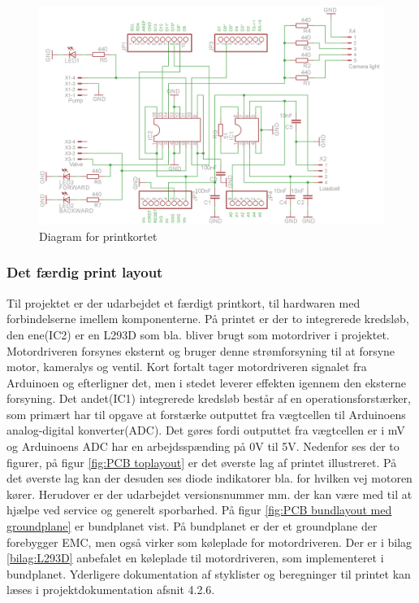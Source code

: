 \begin{figure}[H]
	\centering
	\includegraphics[width=1\textwidth]{billeder/Hovedrapport/Diagram.png}
	\caption{Diagram for printkortet}
	\label{fig:PCBdiagram}
\end{figure}

\newpage

\subsubsection{Det færdig print layout}
Til projektet er der udarbejdet et færdigt printkort, til hardwaren med forbindelserne imellem komponenterne. På printet er der to integrerede kredsløb, den ene(IC2) er en L293D som bla. bliver brugt som motordriver i projektet. Motordriveren forsynes eksternt og bruger denne strømforsyning til at forsyne motor, kameralys og ventil. Kort fortalt tager motordriveren signalet fra Arduinoen og efterligner det, men i stedet leverer effekten igennem den eksterne forsyning. Det andet(IC1) integrerede kredsløb består af en operationsforstærker, som primært har til opgave at forstærke outputtet fra vægtcellen til Arduinoens analog-digital konverter(ADC). Det gøres fordi outputtet fra vægtcellen er i mV og Arduinoens ADC har en arbejdsspænding på 0V til 5V. Nedenfor ses der to figurer, på figur \ref{fig:PCB toplayout} er det øverste lag af printet illustreret. På det øverste lag kan der desuden ses diode indikatorer bla. for hvilken vej motoren kører. Herudover er der udarbejdet versionsnummer mm. der kan være med til at hjælpe ved service og generelt sporbarhed. På figur \ref{fig:PCB bundlayout med groundplane} er bundplanet vist. På bundplanet er der et groundplane der forebygger EMC, men også virker som køleplade for motordriveren. Der er i bilag \ref{bilag:L293D} anbefalet en køleplade til motordriveren, som implementeret i bundplanet. Yderligere dokumentation af styklister og beregninger til printet kan læses i projektdokumentation afsnit 4.2.6. 


